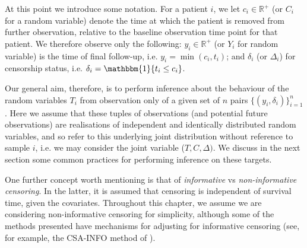 \documentclass[../thesis.tex]{subfiles}
\begin{document}
At this point we introduce some notation. For a patient $i$, we let $c_i \in \mathbb{R}^{+}$ (or $C_i$ for a random variable) denote the time at which the patient is removed from further observation, relative to the baseline observation time point for that patient. We therefore observe only the following: $y_i \in \mathbb{R}^{+}$ (or $Y_i$ for random variable) is the time of final follow-up, i.e. $y_i = \min(c_i, t_i)$; and $\delta_i$ (or $\Delta_i$) for censorship status, i.e. $\delta_i = \mathbbm{1}\{t_i \leq c_i\}$. 

Our general aim, therefore, is to perform inference about the behaviour of the random variables $T_i$ from observation only of a given set of $n$ pairs $\{(y_i, \delta_i)\}_{i=1}^{n}$. Here we assume that these tuples of observations (and potential future observations) are realisations of independent and identically distributed random variables, and so refer to this underlying joint distribution without reference to sample $i$, i.e. we may consider the joint variable ($T, C, \Delta)$.  We discuss in the next section some common practices for performing inference on these targets.

One further concept worth mentioning is that of \emph{informative} vs \emph{non-informative censoring}. In the latter, it is assumed that censoring is independent of survival time, given the covariates. Throughout this chapter, we assume we are considering non-informative censoring for simplicity, although some of the methods presented have mechanisms for adjusting for informative censoring (see, for example, the CSA-INFO method of \citealp{chapfuwa_enabling_2021}).
   
\end{document}
